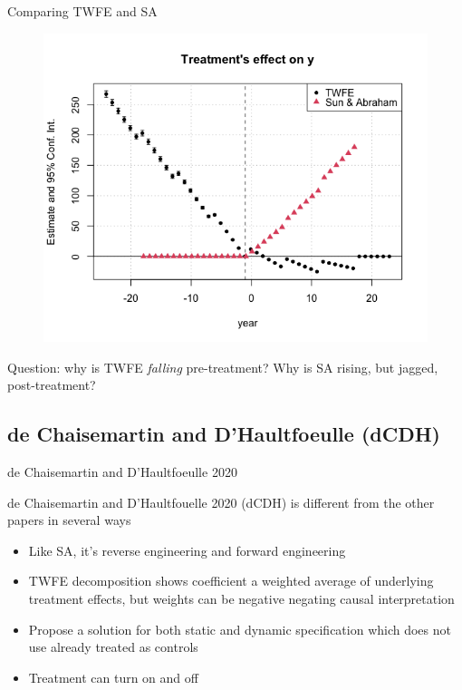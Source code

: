 \documentclass{beamer}
\begin{document}
\begin{frame}{Comparing TWFE and SA }

\begin{figure}
\begin{center}
             \includegraphics[scale=0.4]{./lecture_includes/twfe_sa_event}
\end{center}
\end{figure}

Question: why is TWFE \emph{falling} pre-treatment?  Why is SA rising, but jagged, post-treatment?

\end{frame}


\subsection{de Chaisemartin and D'Haultfoeulle (dCDH)}

\begin{frame}{de Chaisemartin and D'Haultfoeulle 2020}

de Chaisemartin and D'Haultfouelle 2020 (dCDH) is different from the other papers in several ways
	\begin{itemize}
	\item Like SA, it's reverse engineering and forward engineering
	\item TWFE decomposition shows coefficient a weighted average of underlying treatment effects, but weights can be negative negating causal interpretation
	\item Propose a solution for both static and dynamic specification which does not use already treated as controls
	\item Treatment can turn on and off
	\end{itemize}

\end{frame}
\end{document}
